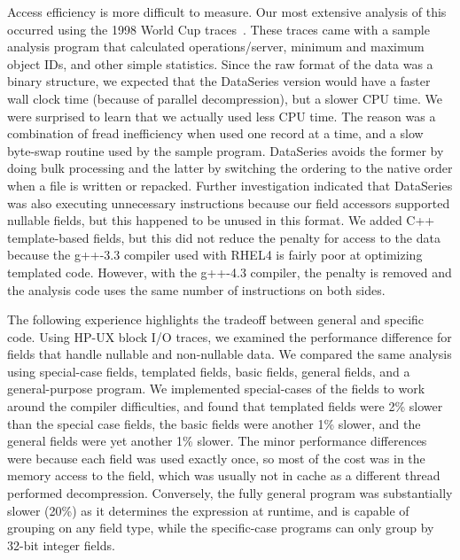 \documentclass{acm_proc_article-sp}
\begin{document}
Access efficiency 
is more difficult to measure.  Our most
extensive analysis of this occurred using the 1998 World Cup
traces~\cite{ita-wcweb98}.  These traces came with a sample analysis
program that calculated operations/server, minimum and maximum object
IDs, and other simple statistics.  Since the raw format of the data
was a binary structure, we expected that the DataSeries version would
have a faster wall clock time (because of parallel decompression), but
a slower CPU time.  We were surprised to learn that we actually used
less CPU time.  The reason 
was a combination of fread
inefficiency when used one record at a time, and a slow byte-swap
routine used by the sample program.  DataSeries avoids the former by
doing bulk processing and the latter by switching the ordering to the
native order when a file is written or repacked.  Further
investigation indicated that DataSeries was also executing unnecessary
instructions because our field accessors supported nullable fields,
but this happened to be unused in this format.  We added C++ 
template-based fields, 
but this did not reduce the penalty for access to the
data because the g++-3.3 compiler used with RHEL4 is fairly poor at
optimizing templated code.  However, with the g++-4.3 compiler, the
penalty is removed and the analysis code uses the same number of 
instructions on both sides.

The following experience highlights the tradeoff between general and specific
code.  
Using HP-UX block I/O traces,
we examined the performance difference for fields
that handle nullable and non-nullable data. 
We
compared the same analysis using special-case fields, templated
fields, basic fields, general fields, and a general-purpose program.  We
implemented special-cases of the fields to work around the compiler
difficulties, and found that templated fields were 2\% slower than the
special case fields, the basic fields were another 1\% slower, and the
general fields were yet another 1\% slower.  The 
minor
performance differences
were because each field was used
exactly once, so most of the cost was in the memory access to the
field, which was usually not in cache as a different thread performed
decompression.  Conversely, the fully general program was
substantially slower (20\%) as it determines the expression at
runtime, and is capable of grouping on any field type, while the
specific-case programs can only group by 32-bit integer fields.  
\end{document}
